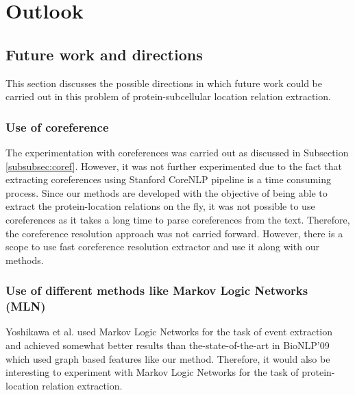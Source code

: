 \chapter{Outlook}\label{chapter:outlook}

\section{Future work and directions}

This section discusses the possible directions in which future work could be carried out in this problem of protein-subcellular location relation extraction.

\subsection{Use of coreference}

The experimentation with coreferences was carried out as discussed in Subsection \ref{subsubsec:coref}. However, it was not further experimented due to the fact that extracting coreferences using Stanford CoreNLP pipeline \cite{manning2014stanford} is a time consuming process. Since our methods are developed with the objective of being able to extract the protein-location relations on the fly, it was not possible to use coreferences as it takes a long time to parse coreferences from the text. Therefore, the coreference resolution approach was not carried forward. However, there is a scope to use fast coreference resolution extractor and use it along with our methods.

\subsection{Use of different methods like Markov Logic Networks (MLN)}


Yoshikawa et al. used Markov Logic Networks \cite{yoshikawa2011coreference} for the task of event extraction and achieved somewhat better results than the-state-of-the-art in BioNLP'09 which used graph based features like our method. Therefore, it would also be interesting to experiment with Markov Logic Networks for the task of protein-location relation extraction.